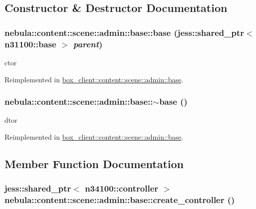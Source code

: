 \subsection{Constructor \& Destructor Documentation}
\hypertarget{classnebula_1_1content_1_1scene_1_1admin_1_1base_a415f430faa5437bfdabe26b23bbbe921}{
\subsubsection[{base}]{\setlength{\rightskip}{0pt plus 5cm}nebula::content::scene::admin::base::base (jess::shared\_\-ptr$<$ {\bf n31100::base} $>$ {\em parent})}}
\label{classnebula_1_1content_1_1scene_1_1admin_1_1base_a415f430faa5437bfdabe26b23bbbe921}


ctor 

Reimplemented in \hyperlink{classbox__client_1_1content_1_1scene_1_1admin_1_1base_a2cd92f663bf7384c9f9799f45b0b03c1}{box\_\-client::content::scene::admin::base}.\hypertarget{classnebula_1_1content_1_1scene_1_1admin_1_1base_a5a4364ca7e8636c7c6345162b1fe9879}{
\subsubsection[{$\sim$base}]{\setlength{\rightskip}{0pt plus 5cm}nebula::content::scene::admin::base::$\sim$base ()}}
\label{classnebula_1_1content_1_1scene_1_1admin_1_1base_a5a4364ca7e8636c7c6345162b1fe9879}


dtor 

Reimplemented in \hyperlink{classbox__client_1_1content_1_1scene_1_1admin_1_1base_ac32a752d8ba5b54d06a3c5864d3c57f8}{box\_\-client::content::scene::admin::base}.

\subsection{Member Function Documentation}
\hypertarget{classnebula_1_1content_1_1scene_1_1admin_1_1base_a5e393e9d882c4d59f67e8ae3be02fd2f}{
\subsubsection[{create\_\-controller}]{\setlength{\rightskip}{0pt plus 5cm}jess::shared\_\-ptr$<$ {\bf n34100::controller} $>$ nebula::content::scene::admin::base::create\_\-controller ()}}
\label{classnebula_1_1content_1_1scene_1_1admin_1_1base_a5e393e9d882c4d59f67e8ae3be02fd2f}


